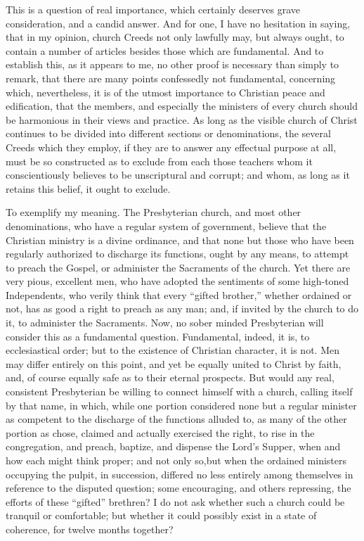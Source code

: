 \documentclass[
]{book}
\begin{document}
This is a question of real importance, which certainly deserves grave consideration, and a candid answer. And for one, I have no hesitation in saying, that in my opinion, church Creeds not only lawfully may, but always ought, to contain a number of articles besides those which are fundamental. And to establish this, as it appears to me, no other proof is necessary than simply to remark, that there are many points confessedly not fundamental, concerning which, nevertheless, it is of the utmost importance to Christian peace and edification, that the members, and especially the ministers of every church should be harmonious in their views and practice. As long as the visible church of Christ continues to be divided into different sections or denominations, the several Creeds which they employ, if they are to answer any effectual purpose at all, must be so constructed as to exclude from each those teachers whom it conscientiously believes to be unscriptural and corrupt; and whom, as long as it retains this belief, it ought to exclude.

To exemplify my meaning. The Presbyterian church, and most other denominations, who have a regular system of government, believe that the Christian ministry is a divine ordinance, and that none but those who have been regularly authorized to discharge its functions, ought by any means, to attempt to preach the Gospel, or administer the Sacraments of the church. Yet there are very pious, excellent men, who have adopted the sentiments of some high-toned Independents, who verily think that every ``gifted brother,'' whether ordained or not, has as good a right to preach as any man; and, if invited by the church to do it, to administer the Sacraments. Now, no sober minded Presbyterian will consider this as a fundamental question. Fundamental, indeed, it is, to ecclesiastical order; but to the existence of Christian character, it is not. Men may differ entirely on this point, and yet be equally united to Christ by faith, and, of course equally safe as to their eternal prospects. But would any real, consistent Presbyterian be willing to connect himself with a church, calling itself by that name, in which, while one portion considered none but a regular minister as competent to the discharge of the functions alluded to, as many of the other portion as chose, claimed and actually exercised the right, to rise in the congregation, and preach, baptize, and dispense the Lord's Supper, when and how each might think proper; and not only so,but when the ordained ministers occupying the pulpit, in succession, differed no less entirely among themselves in reference to the disputed question; some encouraging, and others repressing, the efforts of these ``gifted'' brethren? I do not ask whether such a church could be tranquil or comfortable; but whether it could possibly exist in a state of coherence, for twelve months together?
\end{document}
